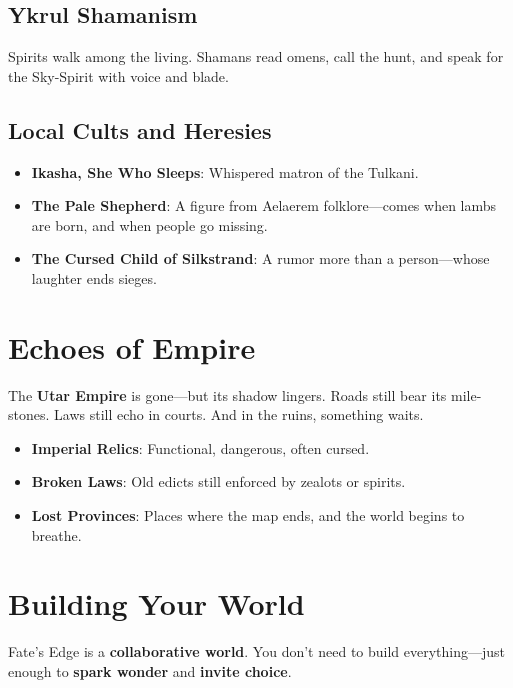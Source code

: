 \subsection*{Ykrul Shamanism}

Spirits walk among the living. Shamans read omens, call the hunt, and speak for the Sky-Spirit with voice and blade.

\subsection*{Local Cults and Heresies}

\begin{itemize}
    \item \textbf{Ikasha, She Who Sleeps}: Whispered matron of the Tulkani.
    \item \textbf{The Pale Shepherd}: A figure from Aelaerem folklore---comes when lambs are born, and when people go missing.
    \item \textbf{The Cursed Child of Silkstrand}: A rumor more than a person---whose laughter ends sieges.
\end{itemize}

\section*{Echoes of Empire}

The \textbf{Utar Empire} is gone---but its shadow lingers. Roads still bear its mile-stones. Laws still echo in courts. And in the ruins, something waits.

\begin{itemize}
    \item \textbf{Imperial Relics}: Functional, dangerous, often cursed.
    \item \textbf{Broken Laws}: Old edicts still enforced by zealots or spirits.
    \item \textbf{Lost Provinces}: Places where the map ends, and the world begins to breathe.
\end{itemize}

\section*{Building Your World}

Fate's Edge is a \textbf{collaborative world}. You don't need to build everything---just enough to \textbf{spark wonder} and \textbf{invite choice}.

